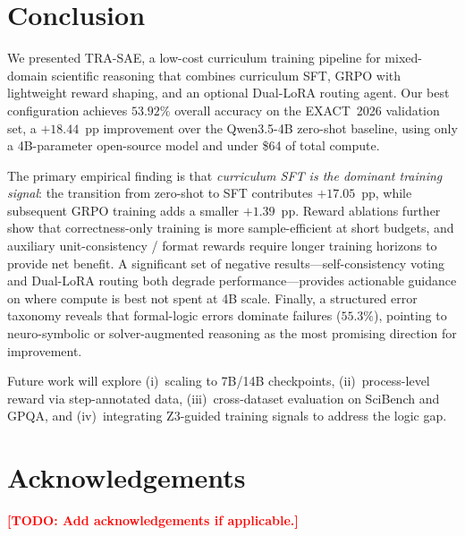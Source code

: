 \documentclass{ieeeaccess}
\newcommand{\todo}[1]{\textcolor{red}{\textbf{[TODO: #1]}}}
\newcommand{\modelname}{\textsc{TRA-SAE}}
\newcommand{\basemodelname}{Qwen3.5-4B}
\newcommand{\dataset}{EXACT~2026}
\begin{document}
\section{Conclusion}
\label{sec:conclusion}

We presented \modelname{}, a low-cost curriculum training pipeline for
mixed-domain scientific reasoning that combines curriculum SFT, GRPO with
lightweight reward shaping, and an optional Dual-LoRA routing agent.
Our best configuration achieves $53.92\%$ overall accuracy on the
\dataset{} validation set, a $+18.44$~pp improvement over the
\basemodelname{} zero-shot baseline, using only a 4B-parameter open-source
model and under \$64 of total compute.

The primary empirical finding is that \emph{curriculum SFT is the dominant
training signal}: the transition from zero-shot to SFT contributes
$+17.05$~pp, while subsequent GRPO training adds a smaller $+1.39$~pp.
Reward ablations further show that correctness-only training is more
sample-efficient at short budgets, and auxiliary unit-consistency /
format rewards require longer training horizons to provide net benefit.
A significant set of negative results---self-consistency voting and
Dual-LoRA routing both degrade performance---provides actionable guidance
on where compute is best not spent at 4B scale.
Finally, a structured error taxonomy reveals that formal-logic errors
dominate failures ($55.3\%$), pointing to neuro-symbolic or
solver-augmented reasoning as the most promising direction for improvement.

Future work will explore (i)~scaling to 7B/14B checkpoints,
(ii)~process-level reward via step-annotated data,
(iii)~cross-dataset evaluation on SciBench and GPQA, and
(iv)~integrating Z3-guided training signals to address the logic gap.

\section*{Acknowledgements}
\todo{Add acknowledgements if applicable.}




\EOD
\end{document}

